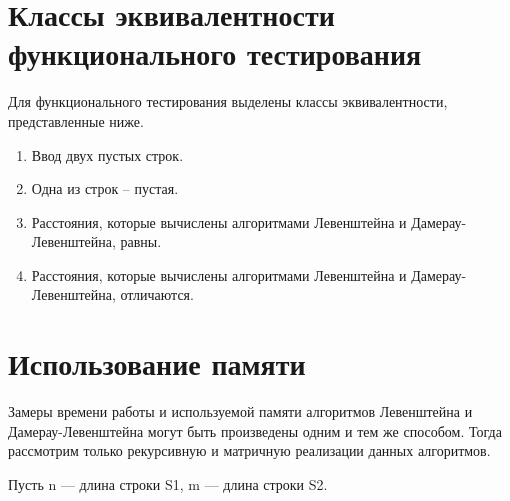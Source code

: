 
\clearpage

\section{Классы эквивалентности функционального тестирования}

Для функционального тестирования выделены классы эквивалентности, представленные ниже.

\begin{enumerate}
    \item Ввод двух пустых строк.
    \item Одна из строк -- пустая.
    \item Расстояния, которые вычислены алгоритмами Левенштейна и Дамерау-Левенштейна, равны.
    \item Расстояния, которые вычислены алгоритмами Левенштейна и Дамерау-Левенштейна, отличаются.
\end{enumerate}

\section{Использование памяти}

Замеры времени работы и используемой памяти алгоритмов Левенштейна и Дамерау-Левенштейна могут быть произведены одним и тем же способом.
Тогда рассмотрим только рекурсивную и матричную реализации данных алгоритмов.

Пусть n --- длина строки S1, m --- длина строки S2.

